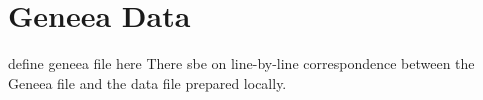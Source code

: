 \chapter{Geneea Data}\label{app:geneea}


\todoA{}

define geneea file here
There sbe on line-by-line correspondence between the Geneea file and the data file prepared locally.
